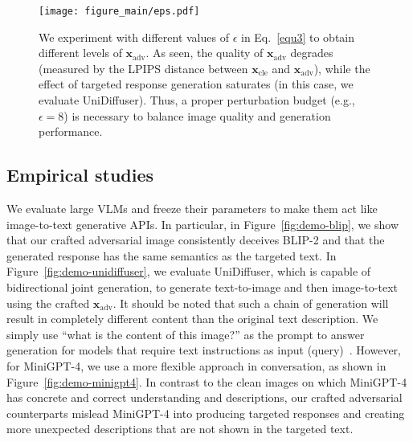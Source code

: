 \begin{figure*}[t]
    \centering
    \vspace{-0.cm}
    \texttt{[image: figure\_main/eps.pdf]}
    \caption{
    We experiment with different values of $\epsilon$ in Eq.~\eqref{equ3} to obtain different levels of ${\boldsymbol{x}_{\text{adv}}}$. As seen, the quality of ${\boldsymbol{x}_{\text{adv}}}$ degrades (measured by the LPIPS distance between ${\boldsymbol{x}_{\text{cle}}}$ and ${\boldsymbol{x}_{\text{adv}}}$), while the effect of targeted response generation saturates (in this case, we evaluate UniDiffuser). Thus, a proper perturbation budget (e.g., $\epsilon=8$) is necessary to balance image quality and generation performance.
    }
    \label{fig:eps}
\end{figure*}

\subsection{Empirical studies}

We evaluate large VLMs and freeze their parameters to make them act like image-to-text generative APIs. In particular, in Figure~\ref{fig:demo-blip}, we show that our crafted adversarial image consistently deceives BLIP-2 and that the generated response has the same semantics as the targeted text. In Figure~\ref{fig:demo-unidiffuser}, we evaluate UniDiffuser, which is capable of bidirectional joint generation, to generate text-to-image and then image-to-text using the crafted $\boldsymbol{x}_{\text{adv}}$. It should be noted that such a chain of generation will result in completely different content than the original text description. We simply use ``what is the content of this image?'' as the prompt to answer generation for models that require text instructions as input (query)~\citep{guoimages}. However, for MiniGPT-4, we use a more flexible approach in conversation, as shown in Figure~\ref{fig:demo-minigpt4}. In contrast to the clean images on which MiniGPT-4 has concrete and correct understanding and descriptions, our crafted adversarial counterparts mislead MiniGPT-4 into producing targeted responses and creating more unexpected descriptions that are not shown in the targeted text.

